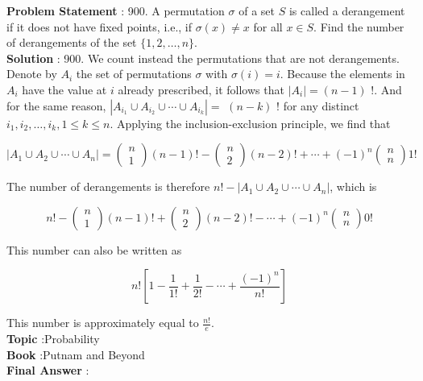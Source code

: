 \documentclass[10pt]{article}
\begin{document}
\textbf{Problem Statement} :
900. A permutation $\sigma$ of a set $S$ is called a derangement if it does not have fixed points, i.e., if $\sigma(x) \neq x$ for all $x \in S$. Find the number of derangements of the set $\{1,2, \ldots, n\}$.
\\
\textbf{Solution} :
900. We count instead the permutations that are not derangements. Denote by $A_{i}$ the set of permutations $\sigma$ with $\sigma(i)=i$. Because the elements in $A_{i}$ have the value at $i$ already prescribed, it follows that $\left|A_{i}\right|=(n-1)$ !. And for the same reason, $\left|A_{i_{1}} \cup A_{i_{2}} \cup \cdots \cup A_{i_{k}}\right|=$ $(n-k)$ ! for any distinct $i_{1}, i_{2}, \ldots, i_{k}, 1 \leq k \leq n$. Applying the inclusion-exclusion principle, we find that 

$$
\left|A_{1} \cup A_{2} \cup \cdots \cup A_{n}\right|=\left(\begin{array}{l}
n \\
1
\end{array}\right)(n-1) !-\left(\begin{array}{l}
n \\
2
\end{array}\right)(n-2) !+\cdots+(-1)^{n}\left(\begin{array}{l}
n \\
n
\end{array}\right) 1 !
$$

The number of derangements is therefore $n !-\left|A_{1} \cup A_{2} \cup \cdots \cup A_{n}\right|$, which is

$$
n !-\left(\begin{array}{l}
n \\
1
\end{array}\right)(n-1) !+\left(\begin{array}{l}
n \\
2
\end{array}\right)(n-2) !-\cdots+(-1)^{n}\left(\begin{array}{l}
n \\
n
\end{array}\right) 0 !
$$

This number can also be written as

$$
n !\left[1-\frac{1}{1 !}+\frac{1}{2 !}-\cdots+\frac{(-1)^{n}}{n !}\right]
$$

This number is approximately equal to $\frac{n !}{e}$.
\\
\textbf{Topic} :Probability\\
\textbf{Book} :Putnam and Beyond\\
\textbf{Final Answer} :\\
\end{document}
